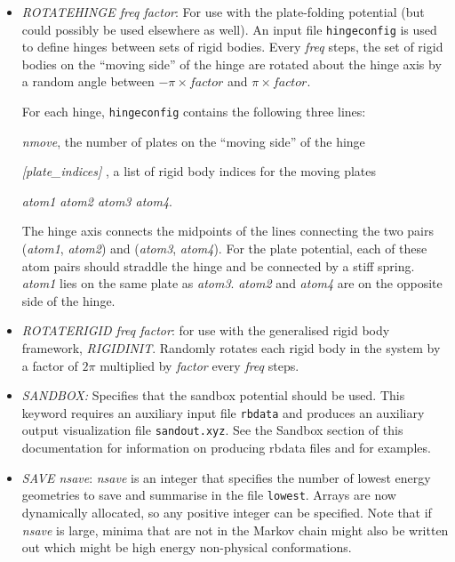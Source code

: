 \documentclass[12pt,a4paper,dvips]{article}
\begin{document}
\begin{itemize}
\item {\it ROTATEHINGE freq factor}: For use with the plate-folding potential (but could possibly be used elsewhere as well). An input file {\tt hingeconfig} is used to define hinges between sets of rigid bodies. Every {\it freq} steps, the set of rigid bodies on the ``moving side'' of the hinge are rotated about the hinge axis by a random angle between $-\pi \times factor$  and $\pi \times factor$.

For each hinge, {\tt hingeconfig} contains the following three lines:

\vspace{0.5cm}

{\it nmove}, the number of plates on the ``moving side'' of the hinge

{\it [plate\_indices] }, a list of rigid body indices for the moving plates

{\it atom1 atom2 atom3 atom4}.

\vspace{0.5cm}

The hinge axis connects the midpoints of the lines connecting the two pairs ({\it atom1}, {\it atom2}) and ({\it atom3}, {\it atom4}). For the plate potential, each of these atom pairs should straddle the hinge and be connected by a stiff spring. {\it atom1} lies on the same plate as {\it atom3}. {\it atom2} and {\it atom4} are on the opposite side of the hinge.

\item {\it ROTATERIGID freq factor}: for use with the generalised rigid body framework, 
{\it RIGIDINIT}. Randomly rotates each rigid body in the system by a factor of $2\pi$ multiplied by {\it factor} every {\it freq} steps.

\item {\it SANDBOX\/:} Specifies that the sandbox potential should be used. This keyword requires an auxiliary input file {\tt rbdata} and produces an auxiliary output visualization file {\tt sandout.xyz}. See the Sandbox section of this documentation for information on producing rbdata files and for examples.

\item {\it SAVE nsave\/}: {\it nsave\/} is an integer that specifies the number of lowest
energy geometries to save and summarise in the file {\tt lowest}. 
Arrays are now dynamically allocated, so any positive integer can be specified. Note that if {\it nsave\/} is large, minima that are not in the Markov chain might also be written out which might be high energy non-physical conformations.  


\end{itemize}
\end{document}
